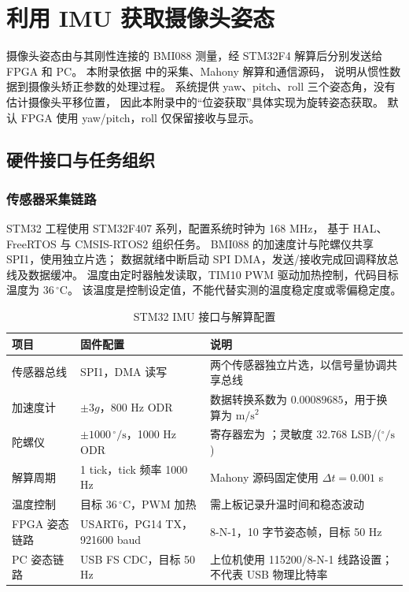 \chapter{利用 IMU 获取摄像头姿态}
\label{app:attitude-estimation}

摄像头姿态由与其刚性连接的 BMI088 测量，经 STM32F4 解算后分别发送给 FPGA 和 PC。
本附录依据  中的采集、Mahony 解算和通信源码，
说明从惯性数据到摄像头矫正参数的处理过程。
系统提供 yaw、pitch、roll 三个姿态角，没有估计摄像头平移位置，
因此本附录中的“位姿获取”具体实现为旋转姿态获取。
默认 FPGA 使用 yaw/pitch，roll 仅保留接收与显示。

\section{硬件接口与任务组织}
\subsection{传感器采集链路}
STM32 工程使用 STM32F407 系列，配置系统时钟为 168 MHz，
基于 HAL、FreeRTOS 与 CMSIS-RTOS2 组织任务。
BMI088 的加速度计与陀螺仪共享 SPI1，使用独立片选；
数据就绪中断启动 SPI DMA，发送/接收完成回调释放总线及数据缓冲。
温度由定时器触发读取，TIM10 PWM 驱动加热控制，代码目标温度为 $36\,^{\circ}\mathrm C$。
该温度是控制设定值，不能代替实测的温度稳定度或零偏稳定度。

\begin{table}[htbp]\centering\small
\caption{STM32 IMU 接口与解算配置}\label{tab:app-imu-config}
\begin{tabularx}{\textwidth}{>{\raggedright\arraybackslash}p{3.5cm}YY}
\toprule
项目 & 固件配置 & 说明 \\
\midrule
传感器总线 & SPI1，DMA 读写 & 两个传感器独立片选，以信号量协调共享总线 \\
加速度计 & $\pm3g$，800 Hz ODR & 数据转换系数为 $0.00089685$，用于换算为 $\mathrm{m/s^2}$ \\
陀螺仪 & $\pm1000\,^{\circ}/\mathrm s$，1000 Hz ODR & 寄存器宏为 ；灵敏度 32.768 LSB/(${}^{\circ}/\mathrm s$) \\
解算周期 & 1 tick，tick 频率 1000 Hz & Mahony 源码固定使用 $\Delta t=0.001$ s \\
温度控制 & 目标 $36\,^{\circ}\mathrm C$，PWM 加热 & 需上板记录升温时间和稳态波动 \\
FPGA 姿态链路 & USART6，PG14 TX，921600 baud & 8-N-1，10 字节姿态帧，目标 50 Hz \\
PC 姿态链路 & USB FS CDC，目标 50 Hz & 上位机使用 115200/8-N-1 线路设置；不代表 USB 物理比特率 \\
\bottomrule
\end{tabularx}
\end{table}

